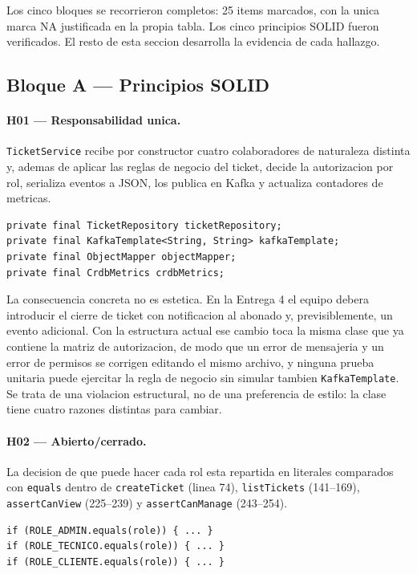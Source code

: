 \documentclass[10pt,a4paper]{article}
\begin{document}
\noindent Los cinco bloques se recorrieron completos: 25 items marcados, con la unica marca
NA justificada en la propia tabla. Los cinco principios SOLID fueron verificados. El resto de
esta seccion desarrolla la evidencia de cada hallazgo.
\subsection{Bloque A --- Principios SOLID}

\paragraph{H01 --- Responsabilidad unica.}
\texttt{TicketService} recibe por constructor cuatro colaboradores de naturaleza distinta y,
ademas de aplicar las reglas de negocio del ticket, decide la autorizacion por rol, serializa
eventos a JSON, los publica en Kafka y actualiza contadores de metricas.

\begin{lstlisting}[caption={\texttt{TicketService.java}, lineas 51--64},firstnumber=51]
private final TicketRepository ticketRepository;
private final KafkaTemplate<String, String> kafkaTemplate;
private final ObjectMapper objectMapper;
private final CrdbMetrics crdbMetrics;
\end{lstlisting}

La consecuencia concreta no es estetica. En la Entrega 4 el equipo debera introducir el
cierre de ticket con notificacion al abonado y, previsiblemente, un evento adicional.
Con la estructura actual ese cambio toca la misma clase que ya contiene la matriz de
autorizacion, de modo que un error de mensajeria y un error de permisos se corrigen
editando el mismo archivo, y ninguna prueba unitaria puede ejercitar la regla de negocio
sin simular tambien \texttt{KafkaTemplate}. Se trata de una violacion estructural, no de
una preferencia de estilo: la clase tiene cuatro razones distintas para cambiar.

\paragraph{H02 --- Abierto/cerrado.}
La decision de que puede hacer cada rol esta repartida en literales comparados con
\texttt{equals} dentro de \texttt{createTicket} (linea 74), \texttt{listTickets}
(141--169), \texttt{assertCanView} (225--239) y \texttt{assertCanManage} (243--254).

\begin{lstlisting}[caption={\texttt{TicketService.java}, lineas 141--168 (extracto)},firstnumber=141]
if (ROLE_ADMIN.equals(role)) { ... }
if (ROLE_TECNICO.equals(role)) { ... }
if (ROLE_CLIENTE.equals(role)) { ... }
\end{lstlisting}
\end{document}
